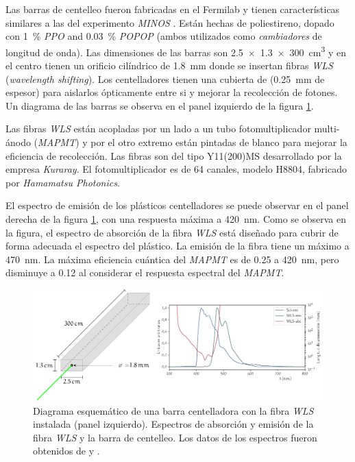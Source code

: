 Las barras de centelleo fueron fabricadas en el Fermilab y tienen características similares a las del experimento \emph{MINOS} \cite{knitta04}. Están hechas de poliestireno, dopado con \SI{1}{\percent} \emph{PPO} and \SI{0.03}{\percent} \emph{POPOP} (ambos utilizados como \emph{cambiadores} de longitud de onda). Las dimensiones de las barras son \SI[product-units=power]{2.5x1.3x300}{\cubic\cm} y en el centro tienen un orificio cilíndrico de \SI{1.8}{\mm} donde se insertan fibras \emph{WLS} (\emph{wavelength shifting}). Los centelladores tienen una cubierta de  (\SI{0.25}{\mm} de espesor) para aislarlos ópticamente entre si y mejorar la recolección de fotones. Un diagrama de las barras se observa en el panel izquierdo de la figura \ref{fig:scibar-optics}.

Las fibras \emph{WLS} están acopladas por un lado a un tubo fotomultiplicador multi-ánodo (\emph{MAPMT}) y por el otro extremo están pintadas de blanco para mejorar la eficiencia de recolección. Las fibras son del tipo Y11(200)MS desarrollado por la empresa \emph{Kuraray}. El fotomultiplicador es de \num{64} canales, modelo H8804, fabricado por \emph{Hamamatsu Photonics}.

El espectro de emisión de los plásticos centelladores se puede observar en el panel derecha de la figura \ref{fig:scibar-optics}, con una respuesta máxima a \SI{420}{\nano\metre}. Como se observa en la figura, el espectro de absorción de la fibra \emph{WLS} está diseñado para cubrir de forma adecuada el espectro del plástico. La emisión de la fibra tiene un máximo a \SI{470}{\nano\metre}. La máxima eficiencia cuántica del \emph{MAPMT} es de \num{0.25} a \SI{420}{\nano\metre}, pero disminuye a \num{0.12} al considerar el respuesta espectral del \emph{MAPMT}.

\begin{figure}
        \centering
        \includegraphics[width=\textwidth]{scibar.pdf}
        \caption{Diagrama esquemático de una barra centelladora con la fibra \emph{WLS} instalada (panel izquierdo). Espectros de absorción y emisión de la fibra \emph{WLS} y la barra de centelleo. Los datos de los espectros fueron obtenidos de \cite{kikawa14} y \cite{dietz16}.}
        \label{fig:scibar-optics}
\end{figure}

